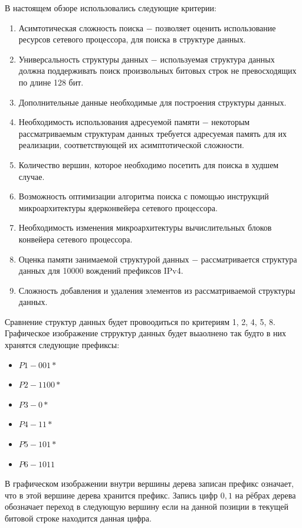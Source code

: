 \documentclass[a4peper, 12pt, titlepage, finall]{report}
\begin{document}
        В настоящем обзоре использовались следующие критерии:
        \begin{enumerate}
            \item Асимтотическая сложность поиска $-$ позволяет оценить использование ресурсов сетевого процессора, для поиска в структуре данных.
            \item Универсальность структуры данных $-$ используемая структура данных должна поддерживать поиск произвольных битовых строк
                  не превосходящих по длине 128 бит.
            \item Дополнительные данные необходимые для построения структуры данных.
            \item Необходимость использования адресуемой памяти $-$ некоторым рассматриваемым структурам данных требуется адресуемая память для их реализации, соответствующей их асимптотической сложности.
            \item Количество вершин, которое необходимо посетить для поиска в худшем случае.
            \item Возможность оптимизации алгоритма поиска с помощью инструкций микроархитектуры ядерконвейера сетевого процессора.
            \item Необходимость изменения микроархитектуры вычислительных блоков конвейера сетевого процессора.
            \item Оценка памяти занимаемой структурой данных $-$ рассматривается структура данных для 10000 вождений префиксов IPv4.
            \item Сложность добавления и удаления элементов из рассматриваемой структуры данных.
        \end{enumerate}

        Сравнение структур данных будет провоодиться по критериям 1, 2, 4, 5, 8.
        \newpage
        Графическое изображение стрруктур данных будет выаолнено так будто в них хранятся следующие префиксы:
        \begin{itemize}
            \item $P1 - 001*$
            \item $P2 - 1100*$
            \item $P3 - 0*$
            \item $P4 - 11*$
            \item $P5 - 101*$
            \item $P6 - 1011$
        \end{itemize}
        В графическом изображении внутри вершины дерева записан префикс означает, что в этой вершине дерева хранится префикс.
        Запись цифр ${0,1}$ на рёбрах дерева обозначает переход в следующую вершину если на данной позиции в текущей битовой строке находится данная цифра.
\end{document}
